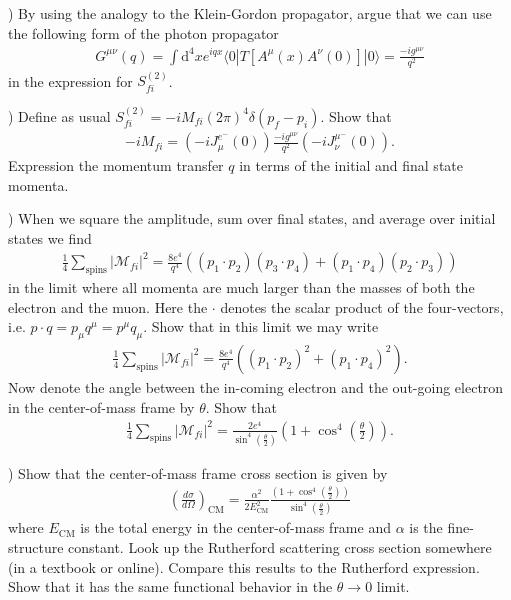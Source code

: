 \documentclass[working, oneside]{../../../Preambles/tuftebook}
\begin{document}
\vspace{1em} 
) By using the analogy to the Klein-Gordon propagator, 
argue that we can use the following form of the photon propagator
\begin{align}
G^{\mu\nu}(q)=\int \textrm{d}^4 x e^{iqx} \langle 0 | T\left[A^{\mu}(x)A^{\nu}(0) \right] |0\rangle=
\frac{-ig^{\mu\nu}}{q^2}
\end{align}
in the expression for $S_{fi}^{(2)}$.

\vspace{1em}
) Define as usual $S_{fi}^{(2)}=-i M_{fi}(2\pi)^4 \delta(p_f-p_i)$. Show that 
\begin{align}
-i M_{fi}=\left(-i J_{\mu}^{e^-}(0)\right) \frac{-ig^{\mu\nu}}{q^2} \left(-i J_{\nu}^{\mu^-}(0)\right).
\end{align}
Expression the momentum transfer $q$ in terms of the initial and final state momenta.

\vspace{1em}
) When we square the amplitude, sum over final states, and average over initial 
states we find 
\begin{align}
\frac{1}{4}\sum_\textrm{spins}|\mathcal{M}_{fi}|^2=\frac{8e^4}{q^4}\left((p_1\cdot p_2)(p_3\cdot p_4)+
(p_1\cdot p_4)(p_2\cdot p_3)\right)
\end{align}
in the limit where all momenta are much larger than the masses of both the electron and the muon. Here
the $\cdot$ denotes the scalar product of the four-vectors, i.e. $p\cdot q=p_\mu q^\mu=p^\mu q_\mu$.
Show that in this limit we may write
\begin{align}
\frac{1}{4}\sum_\textrm{spins}|\mathcal{M}_{fi}|^2=\frac{8e^4}{q^4}\left((p_1\cdot p_2)^2+(p_1\cdot p_4)^2\right).
\end{align}
Now denote the angle between the in-coming electron and the out-going electron in the center-of-mass frame
by $\theta$. Show that 
\begin{align}
\frac{1}{4}\sum_\textrm{spins}|\mathcal{M}_{fi}|^2=\frac{2e^4}{\sin^4(\frac{\theta}{2})}\left(1+\cos^4(\frac{\theta}{2})\right).
\end{align}

\vspace{1em}
) Show that the center-of-mass frame cross section is given by
\begin{align}
\left(\frac{d\sigma}{d\Omega}\right)_\textrm{CM}=\frac{\alpha^2}{2E_{\textrm{CM}}^{2}}\frac{(1+\cos^4(\frac{\theta}{2}))}{\sin^4(\frac{\theta}{2})}
\end{align} 
where $E_\textrm{CM}$ is the total energy in the center-of-mass frame and $\alpha$ is the fine-structure constant. 
Look up the Rutherford scattering cross section somewhere (in a textbook or online). Compare this results to the 
Rutherford expression. Show that it has the same functional behavior in the $\theta\to 0$ limit.
\end{document}
